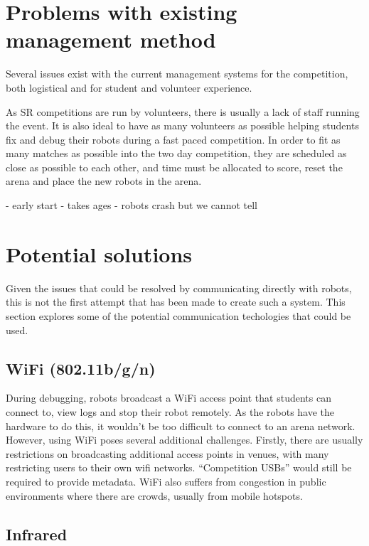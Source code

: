 \documentclass[conference]{IEEEtran}
\begin{document}
\section{Problems with existing management method}

Several issues exist with the current management systems for the competition, both logistical and for student and volunteer experience.

As SR competitions are run by volunteers, there is usually a lack of staff running the event. It is also ideal to have as many volunteers as possible helping students fix and debug their robots during a fast paced competition. In order to fit as many matches as possible into the two day competition, they are scheduled as close as possible to each other, and time must be allocated to score, reset the arena and place the new robots in the arena. 

- early start
- takes ages
- robots crash but we cannot tell

\section{Potential solutions}

Given the issues that could be resolved by communicating directly with robots, this is not the first attempt that has been made to create such a system. This section explores some of the potential communication techologies that could be used.

\subsection{WiFi (802.11b/g/n)}

During debugging, robots broadcast a WiFi access point that students can connect to, view logs and stop their robot remotely. As the robots have the hardware to do this, it wouldn't be too difficult to connect to an arena network. However, using WiFi poses several additional challenges. Firstly, there are usually restrictions on broadcasting additional access points in venues, with many restricting users to their own wifi networks. ``Competition USBs'' would still be required to provide metadata. WiFi also suffers from congestion in public environments where there are crowds, usually from mobile hotspots.

\subsection{Infrared}
\end{document}
